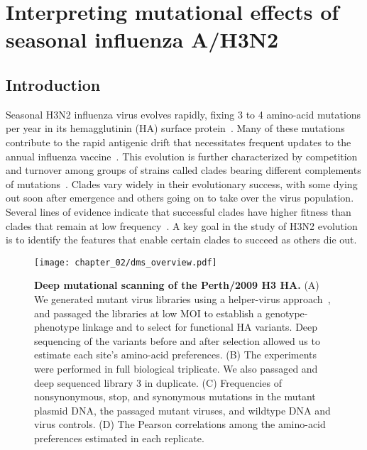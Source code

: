 \chapter{Interpreting mutational effects of seasonal influenza A/H3N2}

\section{Introduction}

Seasonal H3N2 influenza virus evolves rapidly, fixing 3 to 4 amino-acid mutations per year in its hemagglutinin (HA) surface protein~\citep{fitch1997long, bhatt2011genomic}.
Many of these mutations contribute to the rapid antigenic drift that necessitates frequent updates to the annual influenza vaccine~\citep{Smith:2004jc}.
This evolution is further characterized by competition and turnover among groups of strains called clades bearing different complements of mutations~\citep{bedford2011,strelkowa2012clonal,Neher:2014eu,Koelle:2015dh,Bedford:2015fj}.
Clades vary widely in their evolutionary success, with some dying out soon after emergence and others going on to take over the virus population.
Several lines of evidence indicate that successful clades have higher fitness than clades that remain at low frequency~\citep{bedford2011,strelkowa2012clonal,Neher:2014eu,Luksza:2014hj}.
A key goal in the study of H3N2 evolution is to identify the features that enable certain clades to succeed as others die out.

\begin{figure}
  \centering
  \texttt{[image: chapter\_02/dms\_overview.pdf]}
  \caption{\label{fig:dms_overview}
    {\bf Deep mutational scanning of the Perth/2009 H3 HA.}
    (A) We generated mutant virus libraries using a helper-virus approach~\citep{Doud:2016gm}, and passaged the libraries at low MOI to establish a genotype-phenotype      linkage and to select for functional HA variants.
    Deep sequencing of the variants before and after selection allowed us to estimate each site's amino-acid preferences.
    (B) The experiments were performed in full biological triplicate.
    We also passaged and deep sequenced library 3 in duplicate.
    (C) Frequencies of nonsynonymous, stop, and synonymous mutations in the mutant plasmid DNA, the passaged mutant viruses, and wildtype DNA and virus controls.
    (D) The Pearson correlations among the amino-acid preferences estimated in each replicate.
  }
\end{figure}

